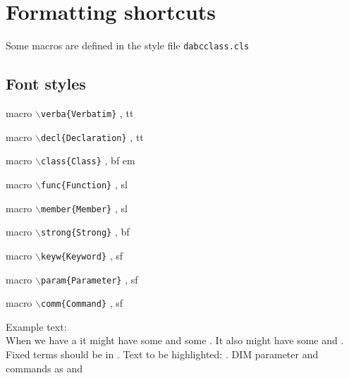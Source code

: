 \section{Formatting shortcuts}
Some macros are defined in the style file {\tt dabcclass.cls}
\subsection{Font styles}
\begin{compactitem}[$\bullet$] 
\item macro {\tt $\backslash$verba\{Verbatim\}} , tt 
\item macro {\tt $\backslash$decl\{Declaration\}} , tt 
\item macro {\tt $\backslash$class\{Class\}} , bf em 
\item macro {\tt $\backslash$func\{Function\}} , sl 
\item macro {\tt $\backslash$member\{Member\}} , sl 
\item macro {\tt $\backslash$strong\{Strong\}} , bf 
\item macro {\tt $\backslash$keyw\{Keyword\}} , sf 
\item macro {\tt $\backslash$param\{Parameter\}} , sf 
\item macro {\tt $\backslash$comm\{Command\}} , sf 
\end{compactitem}
Example text:\\
When we have a  it might have some  and some .
It also might have some  and .
Fixed terms should be in . Text to be highlighted: .
DIM parameter and commands as  and 

